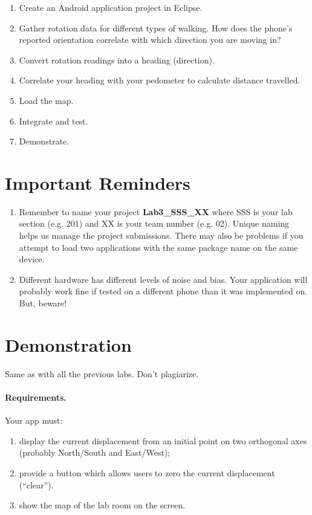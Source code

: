 \documentclass[10pt]{article}
\begin{document}
\begin{enumerate}
\item Create an Android application project in Eclipse.
\item Gather rotation data for different types of walking. How does the phone's reported orientation correlate with which direction you are moving in?
\item Convert rotation readings into a heading (direction).
\item Correlate your heading with your pedometer to calculate distance travelled.
\item Load the map.
\item Integrate and test.
\item Demonstrate.
\end{enumerate}


\section{Important Reminders}
\begin{enumerate}
\item Remember to name your project \textbf{Lab3\_SSS\_XX} where SSS is your lab section (e.g. 201) and XX is your team number (e.g. 02). Unique naming helps us manage the project submissions. There may also be problems if you attempt to load two applications with the same package name on the same device.
\item Different hardware has different levels of noise and bias. Your application will probably work fine if tested on a different phone than it was implemented on. But, beware!
\end{enumerate}

\section{Demonstration}
Same as with all the previous labs. Don't plagiarize.

\paragraph{Requirements.}
Your app must:
\begin{enumerate}
\vspace*{-0.5em}
\item display the current displacement from an initial point
on two orthogonal axes (probably North/South and East/West);
\item provide a button which allows users to zero the current displacement (``clear'').
\item show the map of the lab room on the screen.
\end{enumerate}
\end{document}
